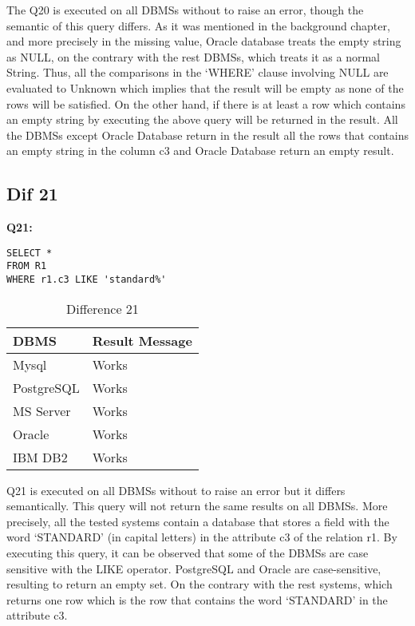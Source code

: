 The Q20 is executed on all DBMSs without to raise an error, though the semantic of this query differs. As it was mentioned in the background chapter, and more precisely in the missing value, Oracle database treats the empty string as NULL, on the contrary with the rest DBMSs, which treats it as a normal String. Thus, all the comparisons in the ‘WHERE’ clause involving NULL are evaluated to Unknown which implies that the result will be empty as none of the rows will be satisfied.  On the other hand, if there is at least a row which contains an empty string by executing the above query will be returned in the result. All the DBMSs except Oracle Database return in the result all the rows that contains an empty string in the column c3 and Oracle Database return an empty result. 



\subsection{Dif 21}

\textbf{Q21:}
\begin{mdframed}[backgroundcolor=lightgray!20]
\begin{lstlisting}[style=SQL]
SELECT *
FROM R1
WHERE r1.c3 LIKE 'standard%'
\end{lstlisting}
\end{mdframed}


\begin{table}[h]
\centering
\caption{Difference 21}
\label{my-label}
\begin{tabular}{|p{2cm}|p{11.5cm}| }
\hline
\textbf{DBMS} & \textbf{Result Message} \\ \hline
Mysql         & Works                   \\ \hline
PostgreSQL    & Works                   \\ \hline
MS Server     & Works                   \\ \hline
Oracle        & Works                   \\ \hline
IBM DB2       & Works                   \\ \hline
\end{tabular}
\end{table}

Q21 is executed on all DBMSs without to raise an error but it differs semantically.  This query will not return the same results on all DBMSs. More precisely, all the tested systems contain a database that stores a field with the word ‘STANDARD’ (in capital letters) in the attribute c3 of the relation r1. By executing this query, it can be observed that some of the DBMSs are case sensitive with the LIKE operator. PostgreSQL and Oracle are case-sensitive, resulting to return an empty set. On the contrary with the rest systems, which returns one row which is the row that contains the word ‘STANDARD’ in the attribute c3.  


